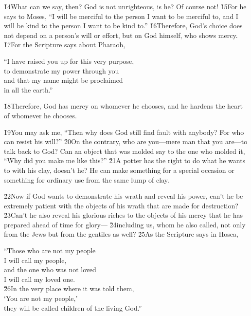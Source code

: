 \v{14}What can we say, then? God is not unrighteous, is he? Of course not! \v{15}For he says to Moses, ``I will be merciful to the person I want to be merciful to, and I will be kind to the person I want to be kind to.'' \v{16}Therefore, God's choice does not depend on a person's will or effort, but on God himself, who shows mercy. \v{17}For the Scripture says about Pharaoh,

\begin{poetry}
\poeml ``I have raised you up for this very purpose, \\
\poemll    to demonstrate my power through you \\
\poeml and that my name might be proclaimed \\
\poemll    in all the earth.''
\end{poetry}

\v{18}Therefore, God has mercy on whomever he chooses, and he hardens the heart of whomever he chooses.

\v{19}You may ask me, ``Then why does God still find fault with anybody? For who can resist his will?'' \v{20}On the contrary, who are you---mere man that you are---to talk back to God? Can an object that was molded say to the one who molded it, ``Why did you make me like this?'' \v{21}A potter has the right to do what he wants to with his clay, doesn't he? He can make something for a special occasion or something for ordinary use from the same lump of clay.

\v{22}Now if God wants to demonstrate his wrath and reveal his power, can't he be extremely patient with the objects of his wrath that are made for destruction? \v{23}Can't he also reveal his glorious riches to the objects of his mercy that he has prepared ahead of time for glory--- \v{24}including us, whom he also called, not only from the Jews but from the gentiles as well? \v{25}As the Scripture says in Hosea,

\begin{poetry}
\poeml ``Those who are not my people \\
\poemll    I will call my people, \\
\poeml and the one who was not loved \\
\poemll    I will call my loved one. \\
\poeml \v{26}In the very place where it was told them, \\
\poemll    `You are not my people,' \\
\poemlll       they will be called children of the living God.''
\end{poetry}

